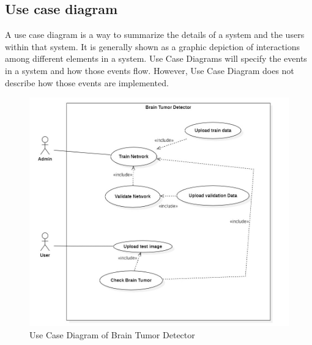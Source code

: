 \subsection{Use case diagram}
\vspace{-18pt}
A use case diagram is a way to summarize the details of a system and the users within that system. It is generally shown as a graphic depiction of interactions among different elements in a system. Use Case Diagrams will specify the events in a system and how those events flow. However, Use Case Diagram does not describe how those events are implemented.
\begin{figure}[h]
\begin{center}
	\includegraphics[width=5in]{images/ucd.jpg} 
	\caption{Use Case Diagram of Brain Tumor Detector} %
	\label{Use Case Diagram of Brain Tumor Detector} %
\end{center}
\end{figure}

